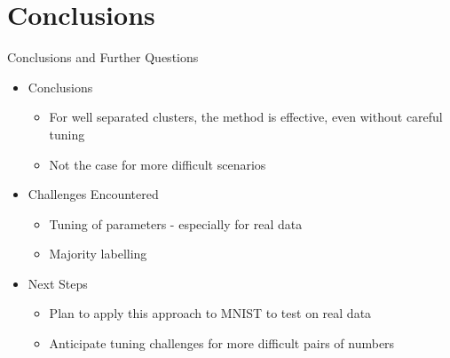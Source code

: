 \section{Conclusions}

\begin{frame}{Conclusions and Further Questions}
    \begin{itemize}

        \item Conclusions
        \begin{itemize}
            \item For well separated clusters, the method is effective, even without careful tuning

            \item Not the case for more difficult scenarios
        \end{itemize}

        \item Challenges Encountered
        \begin{itemize}
            \item Tuning of parameters - especially for real data
            \item Majority labelling
        \end{itemize}

        \item Next Steps

        \begin{itemize}
            \item Plan to apply this approach to MNIST to test on real data

            \item Anticipate tuning challenges for more difficult pairs of numbers
        \end{itemize}
        
    \end{itemize}
\end{frame}